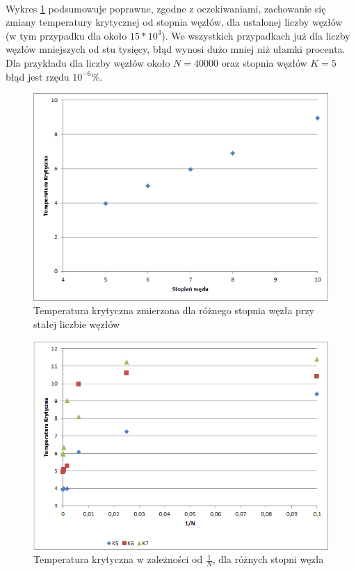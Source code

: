 \documentclass[12pt,a4paper]{article}
\begin{document}
\paragraph{}
Wykres \ref{fig:TcOdK} podsumowuje poprawne, zgodne z oczekiwaniami, zachowanie się zmiany temperatury krytycznej od stopnia węzłów, dla ustalonej liczby węzłów (w tym przypadku dla około $15*10^3$). We wszystkich przypadkach już dla liczby węzłów mniejszych  od stu tysięcy, błąd wynosi dużo mniej niż ułamki procenta. Dla przykładu dla liczby węzłów około $N = 40000$ oraz stopnia węzłów $K=5$ błąd jest rzędu $10^{-6}\%$.

\begin{figure}
\includegraphics[width=\textwidth]{TodK.png}
\caption{Temperatura krytyczna zmierzona dla różnego stopnia węzła przy stałej liczbie węzłów}
\label{fig:TcOdK}
\end{figure}

\begin{figure}
\includegraphics[width=\textwidth]{K5K6K7.png}
\caption{Temperatura krytyczna w zależności od $\frac{1}{N}$, dla różnych stopni węzła}
\label{fig:TcOd1/N.1}
\end{figure}
\end{document}
